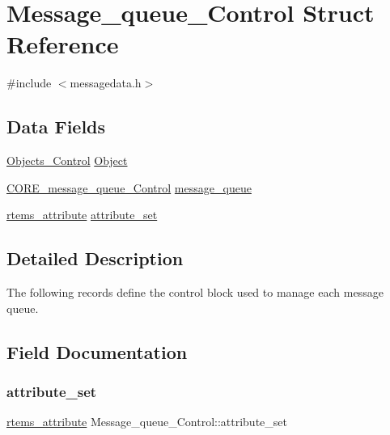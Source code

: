 \hypertarget{structMessage__queue__Control}{}\section{Message\+\_\+queue\+\_\+\+Control Struct Reference}
\label{structMessage__queue__Control}


{\ttfamily \#include $<$messagedata.\+h$>$}

\subsection*{Data Fields}
\begin{DoxyCompactItemize}
\item 
\mbox{\hyperlink{structObjects__Control}{Objects\+\_\+\+Control}} \mbox{\hyperlink{structMessage__queue__Control_adf90be8799c2cee63fb9afcb74af07eb}{Object}}
\item 
\mbox{\hyperlink{structCORE__message__queue__Control}{C\+O\+R\+E\+\_\+message\+\_\+queue\+\_\+\+Control}} \mbox{\hyperlink{structMessage__queue__Control_aee6e7397c76d25b3eb4ea97ad25d3927}{message\+\_\+queue}}
\item 
\mbox{\hyperlink{group__ClassicAttributes_gaea40313cf78ed843e09c4315d0a10f79}{rtems\+\_\+attribute}} \mbox{\hyperlink{structMessage__queue__Control_a561c674299ffd4dd8cd4489bfb265336}{attribute\+\_\+set}}
\end{DoxyCompactItemize}


\subsection{Detailed Description}
The following records define the control block used to manage each message queue. 

\subsection{Field Documentation}
\mbox{\label{structMessage__queue__Control_a561c674299ffd4dd8cd4489bfb265336}} 
\subsubsection{\texorpdfstring{attribute\_set}{attribute\_set}}
{\footnotesize\ttfamily \mbox{\hyperlink{group__ClassicAttributes_gaea40313cf78ed843e09c4315d0a10f79}{rtems\+\_\+attribute}} Message\+\_\+queue\+\_\+\+Control\+::attribute\+\_\+set}

